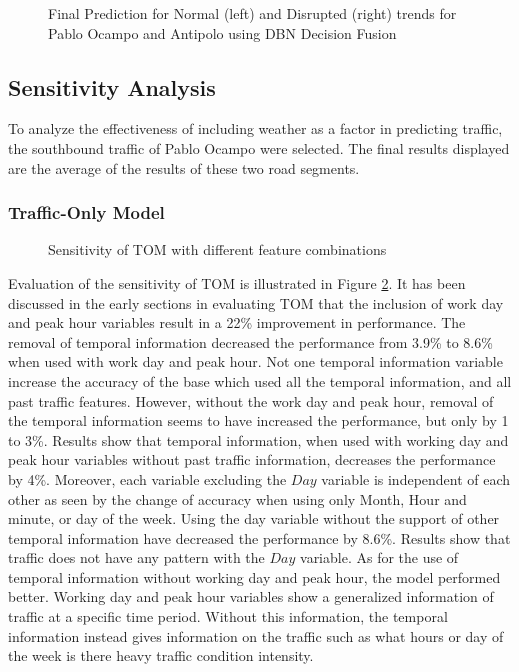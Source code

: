 \begin{figure}[h]
  \centering
  \captionsetup{justification=centering}
  \caption{Final Prediction for Normal (left) and Disrupted (right) trends for Pablo Ocampo and Antipolo using DBN Decision Fusion}
  \label{fig:final_prediction}
\end{figure}



\subsection{Sensitivity Analysis}
To analyze the effectiveness of including weather as a factor in predicting traffic, the southbound traffic of Pablo Ocampo were selected. The final results displayed are the average of the results of these two road segments.

\subsubsection{Traffic-Only Model}

\begin{figure}[h]
  \centering
  \captionsetup{justification=centering}
  \caption{Sensitivity of TOM with different feature combinations}
  \label{fig:TOM_sensitivity}
\end{figure}

Evaluation of the sensitivity of TOM is illustrated in Figure \ref{fig:TOM_sensitivity}. It has been discussed in the early sections in evaluating TOM that the inclusion of work day and peak hour variables result in a 22\% improvement in performance. The removal of temporal information decreased the performance from 3.9\% to 8.6\% when used with work day and peak hour. Not one temporal information variable increase the accuracy of the base which used all the temporal information, and all past traffic features. However, without the work day and peak hour, removal of the temporal information seems to have increased the performance, but only by 1 to 3\%. Results show that temporal information, when used with working day and peak hour variables without past traffic information, decreases the performance by 4\%. Moreover, each variable excluding the $Day$ variable is independent of each other as seen by the change of accuracy when using only Month, Hour and minute, or day of the week. Using the day variable without the support of other temporal information have decreased the performance by 8.6\%. Results show that traffic does not have any pattern with the $Day$ variable. As for the use of temporal information without working day and peak hour, the model performed better. Working day and peak hour variables show a generalized information of traffic at a specific time period. Without this information, the temporal information instead gives information on the traffic such as what hours or day of the week is there heavy traffic condition intensity. 

